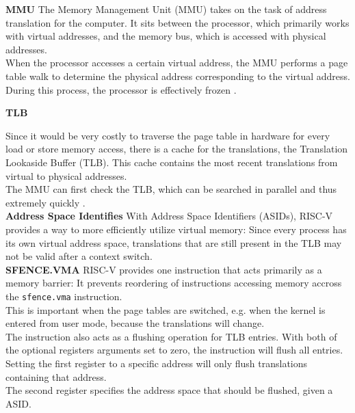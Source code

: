 
\textbf{MMU}
The Memory Management Unit (MMU) takes on the task of address translation for the computer.
It sits between the processor, which primarily works with virtual addresses, and the memory bus,
which is accessed with physical addresses.\\ When the processor accesses a certain virtual address,
the MMU performs a page table walk to determine the physical address corresponding to the virtual
address. During this process, the processor is effectively frozen \cite{jacobVirtualMemoryContemporary1998}.

\textbf{TLB}

Since it would be very costly to traverse the page table in hardware for every load or store memory access,
there is a cache for the translations, the Translation Lookaside Buffer (TLB). This cache contains
the most recent translations from virtual to physical addresses.\\
The MMU can first check the TLB, which can be searched in parallel and thus extremely quickly \cite{drepper2007every,jacobVirtualMemoryContemporary1998}.\\




\textbf{Address Space Identifies}
With Address Space Identifiers (ASIDs), RISC-V provides a way to more efficiently utilize virtual memory:
Since every process has its own virtual address space, translations that are still present in the
TLB may not be valid after a context switch.\\

\textbf{SFENCE.VMA} RISC-V provides one instruction that acts primarily as a memory barrier:
It prevents reordering of instructions accessing memory accross the \texttt{sfence.vma} instruction.\\
This is important when the page tables are switched, e.g. when the kernel is entered from user mode,
because the translations will change.\\
The instruction also acts as a flushing operation for TLB entries. With both of the optional registers
arguments set to zero, the instruction will flush all entries.\\
Setting the first register to a specific address will only flush translations containing that address.\\
The second register specifies the address space that should be flushed, given a ASID.

